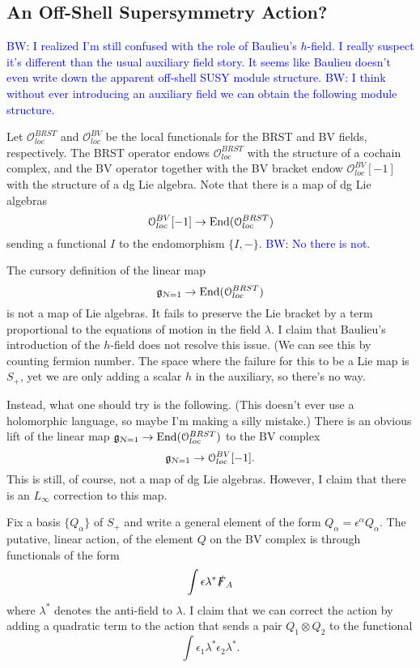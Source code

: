 \documentclass[10pt, oneside]{article}
\newcommand{\brian}[1]{\textcolor{blue}{BW: #1}}
\begin{document}



\subsection{An Off-Shell Supersymmetry Action?}
\brian{I realized I'm still confused with the role of Baulieu's $h$-field. 
I really suspect it's different than the usual auxiliary field story. 
It seems like Baulieu doesn't even write down the apparent off-shell SUSY module structure. 
}
\brian{I think without ever introducing an auxiliary field we can obtain the following module structure.}

\def\oloc{\mathcal{O}_{loc}}

Let $\oloc^{BRST}$ and $\oloc^{BV}$ be the local functionals for the BRST and BV fields, respectively. 
The BRST operator endows $\oloc^{BRST}$ with the structure of a cochain complex, and the BV operator together with the BV bracket endow $\oloc^{BV}[-1]$ with the structure of a dg Lie algebra. 
Note that there is a map of dg Lie algebras
\[
\oloc^{BV}[-1] \to {\rm End}(\oloc^{BRST})
\]
sending a functional $I$ to the endomorphism $\{I,-\}$.
\brian{No there is not.}

\def\cN{\mathcal{N}}

The cursory definition of the linear map
\[
\mf g_{\cN=1} \to {\rm End}(\oloc^{BRST})
\]
is not a map of Lie algebras. 
It fails to preserve the Lie bracket by a term proportional to the equations of motion in the field $\lambda$. 
I claim that Baulieu's introduction of the $h$-field does not resolve this issue. (We can see this by counting fermion number. 
The space where the failure for this to be a Lie map is $S_+$, yet we are only adding a scalar $h$ in the auxiliary, so there's no way.

Instead, what one should try is the following. 
(This doesn't ever use a holomorphic language, so maybe I'm making a silly mistake.)
There is an obvious lift of the linear map $\mf g_{\cN=1} \to {\rm End}(\oloc^{BRST})$ to the BV complex
\[
\mf g_{\cN=1} \to \oloc^{BV} [-1] .
\]
This is still, of course, not a map of dg Lie algebras.
However, I claim that there is an $L_\infty$ correction to this map. 

Fix a basis $\{Q_\alpha\}$ of $S_+$ and write a general element of the form $Q_{\alpha} = \epsilon^\alpha Q_\alpha$.
The putative, linear action, of the element $Q$ on the BV complex is through functionals of the form
\[
\int \epsilon \lambda^* \slashed{F}_A 
\]
where $\lambda^*$ denotes the anti-field to $\lambda$. 
I claim that we can correct the action by adding a quadratic term to the action that sends a pair $Q_1 \otimes Q_2$ to the functional
\[
\int \epsilon_1 \lambda^* \epsilon_2 \lambda^*  .
\] 
\end{document}
